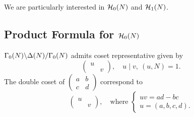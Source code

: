 We are particularly interested in $\hecke_0(N)$ and $\hecke_1(N)$.

\subsection{Product Formula for \texorpdfstring{$\hecke_0(N)$}{H0N}}

\begin{theorem}\label{coset representative of R0N}
    $\bico{\Delta(N)}{\Gamma_0(N)}{\Gamma_0(N)}$
    admits coset representative given by \[\begin{pmatrix}
        u &\\ & v
    \end{pmatrix},\quad u\mid v,\ (u, N) = 1.\]
    The double coset of $\begin{pmatrix}
        a &b\\c&d
    \end{pmatrix}$ correspond to\[\begin{pmatrix}
        u &\\ & v
    \end{pmatrix},\quad\text{where } \begin{cases}
        uv = ad - bc\\
        u = (a, b, c, d).
    \end{cases}\]
\end{theorem}

